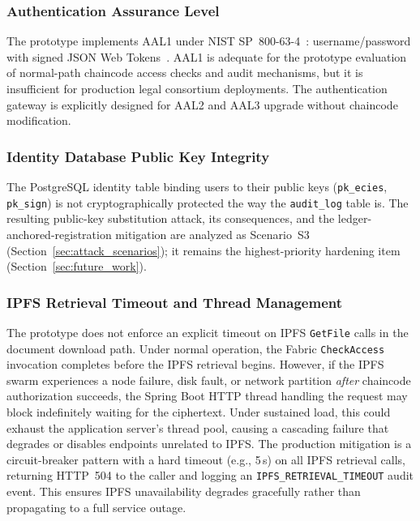 \documentclass[preprint,12pt]{elsarticle}
\begin{document}
\subsubsection{Authentication Assurance Level}
The prototype implements AAL1 under NIST SP~800-63-4~\cite{nist800634}:
username/password with signed JSON Web Tokens~\cite{rfc7519jwt}.
AAL1 is adequate for the prototype evaluation of normal-path
chaincode access checks and audit mechanisms, but it is insufficient
for production legal consortium deployments. The authentication gateway is explicitly designed for
AAL2 and AAL3 upgrade without chaincode modification.

\subsubsection{Identity Database Public Key Integrity}

The PostgreSQL identity table binding users to their public keys
(\texttt{pk\_ecies}, \texttt{pk\_sign}) is not cryptographically
protected the way the \texttt{audit\_log} table is. The resulting
public-key substitution attack, its consequences, and the
ledger-anchored-registration mitigation are analyzed as Scenario~S3
(Section~\ref{sec:attack_scenarios}); it remains the highest-priority
hardening item (Section~\ref{sec:future_work}).

\subsubsection{IPFS Retrieval Timeout and Thread Management}

The prototype does not enforce an explicit timeout on IPFS \texttt{GetFile} calls in the document download path. Under normal operation, the Fabric \texttt{CheckAccess} invocation completes before the IPFS retrieval begins. However, if the IPFS swarm experiences a node failure, disk fault, or network partition \emph{after} chaincode authorization succeeds, the Spring Boot HTTP thread handling the request may block indefinitely waiting for the ciphertext. Under sustained load, this could exhaust the application server's thread pool, causing a cascading failure that degrades or disables endpoints unrelated to IPFS. The production mitigation is a circuit-breaker pattern with a hard timeout (e.g., 5\,s) on all IPFS retrieval calls, returning HTTP~504 to the caller and logging an \texttt{IPFS\_RETRIEVAL\_TIMEOUT} audit event. This ensures IPFS unavailability degrades gracefully rather than propagating to a full service outage.
\end{document}
